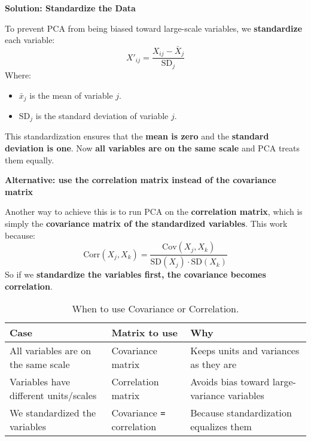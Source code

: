 \highspace
\begin{flushleft}
    \textcolor{Green3}{ \textbf{Solution: Standardize the Data}}
\end{flushleft}
To prevent PCA from being biased toward large-scale variables, we \textbf{standardize} each variable:
\begin{equation}
    X'_{ij} = \frac{X_{ij} - \bar{X}_{j}}{\text{SD}_{j}}
\end{equation}
Where:
\begin{itemize}
    \item $\bar{x}_{j}$ is the mean of variable $j$.
    \item $\text{SD}_{j}$ is the standard deviation of variable $j$.
\end{itemize}
This standardization ensures that the \textbf{mean is zero} and the \textbf{standard deviation is one}. Now \textbf{all variables are on the same scale} and PCA treats them equally.

\newpage

\begin{flushleft}
    \textcolor{Green3}{ \textbf{Alternative: use the correlation matrix instead of the covariance matrix}}
\end{flushleft}
Another way to achieve this is to run PCA on the \textbf{correlation matrix}, which is simply the \textbf{covariance matrix of the standardized variables}. This work because:
\begin{equation}
    \text{Corr}(X_{j}, X_{k}) = \dfrac{\text{Cov}(X_{j}, X_{k})}{\text{SD}\left(X_{j}\right) \cdot \text{SD}\left(X_{k}\right)}
\end{equation}
So if we \textbf{standardize the variables first, the covariance becomes correlation}.

\highspace
\begin{table}[!htp]
    \centering
    \begin{adjustbox}{width={\textwidth},totalheight={\textheight},keepaspectratio}
        \begin{tabular}{@{} l | l | l @{}}
            \toprule
            \textbf{Case}                           & \textbf{Matrix to use}              & \textbf{Why} \\
            \midrule
            All variables are on the same scale     & Covariance matrix                   & Keeps units and variances as they are \\ [.3em]
            Variables have different units/scales   & Correlation matrix                  & Avoids bias toward large-variance variables \\ [.3em]
            We standardized the variables           & Covariance \texttt{=} correlation   & Because standardization equalizes them \\
            \bottomrule
        \end{tabular}
    \end{adjustbox}
    \caption{When to use Covariance or Correlation.}
\end{table}